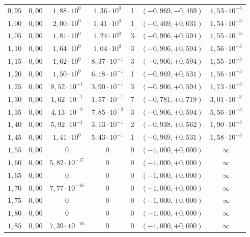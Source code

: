 \begin{tabular}{ccccccc}
$0{,}95$ & $0{,}00$ & $1{,}88 \cdot 10^{0}$ & $1{,}36 \cdot 10^{0}$ & 1 & $(-0{,}969, -0{,}469)$ & $1{,}53 \cdot 10^{-3}$ \\
$1{,}00$ & $0{,}00$ & $2{,}00 \cdot 10^{0}$ & $1{,}41 \cdot 10^{0}$ & 1 & $(-0{,}469, +0{,}031)$ & $1{,}54 \cdot 10^{-3}$ \\
$1{,}05$ & $0{,}00$ & $1{,}81 \cdot 10^{0}$ & $1{,}24 \cdot 10^{0}$ & 3 & $(-0{,}906, +0{,}594)$ & $1{,}55 \cdot 10^{-3}$ \\
$1{,}10$ & $0{,}00$ & $1{,}64 \cdot 10^{0}$ & $1{,}04 \cdot 10^{0}$ & 3 & $(-0{,}906, +0{,}594)$ & $1{,}56 \cdot 10^{-3}$ \\
$1{,}15$ & $0{,}00$ & $1{,}62 \cdot 10^{0}$ & $8{,}37 \cdot 10^{-1}$ & 3 & $(-0{,}906, +0{,}594)$ & $1{,}55 \cdot 10^{-3}$ \\
$1{,}20$ & $0{,}00$ & $1{,}50 \cdot 10^{0}$ & $6{,}18 \cdot 10^{-1}$ & 1 & $(-0{,}969, +0{,}531)$ & $1{,}56 \cdot 10^{-3}$ \\
$1{,}25$ & $0{,}00$ & $8{,}52 \cdot 10^{-1}$ & $3{,}90 \cdot 10^{-1}$ & 3 & $(-0{,}906, +0{,}594)$ & $1{,}73 \cdot 10^{-3}$ \\
$1{,}30$ & $0{,}00$ & $1{,}62 \cdot 10^{-1}$ & $1{,}57 \cdot 10^{-1}$ & 7 & $(-0{,}781, +0{,}719)$ & $3{,}01 \cdot 10^{-3}$ \\
$1{,}35$ & $0{,}00$ & $4{,}13 \cdot 10^{-2}$ & $7{,}85 \cdot 10^{-2}$ & 3 & $(-0{,}906, +0{,}594)$ & $5{,}56 \cdot 10^{-3}$ \\
$1{,}40$ & $0{,}00$ & $5{,}92 \cdot 10^{-1}$ & $3{,}13 \cdot 10^{-1}$ & 2 & $(-0{,}938, +0{,}562)$ & $1{,}90 \cdot 10^{-3}$ \\
$1{,}45$ & $0{,}00$ & $1{,}41 \cdot 10^{0}$ & $5{,}43 \cdot 10^{-1}$ & 1 & $(-0{,}969, +0{,}531)$ & $1{,}58 \cdot 10^{-3}$ \\
$1{,}55$ & $0{,}00$ & $0$ & $0$ & 0 & $(-1{,}000, +0{,}000)$ & $\infty$ \\
$1{,}60$ & $0{,}00$ & $5{,}82 \cdot 10^{-17}$ & $0$ & 0 & $(-1{,}000, +0{,}000)$ & $\infty$ \\
$1{,}65$ & $0{,}00$ & $0$ & $0$ & 0 & $(-1{,}000, +0{,}000)$ & $\infty$ \\
$1{,}70$ & $0{,}00$ & $7{,}77 \cdot 10^{-16}$ & $0$ & 0 & $(-1{,}000, +0{,}000)$ & $\infty$ \\
$1{,}75$ & $0{,}00$ & $0$ & $0$ & 0 & $(-1{,}000, +0{,}000)$ & $\infty$ \\
$1{,}80$ & $0{,}00$ & $0$ & $0$ & 0 & $(-1{,}000, +0{,}000)$ & $\infty$ \\
$1{,}85$ & $0{,}00$ & $7{,}39 \cdot 10^{-16}$ & $0$ & 0 & $(-1{,}000, +0{,}000)$ & $\infty$ \\

\end{tabular}
